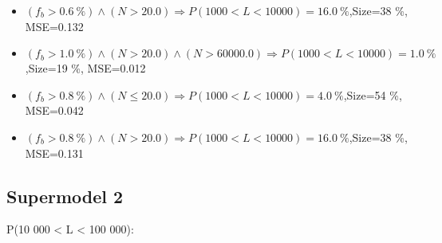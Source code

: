 \documentclass[numbered]{CSL}
\begin{document}
\begin{itemize}
\item $(f_b > 0.6~\%) \land (N > 20.0) \Rightarrow P(1 000 < L < 10 000) = 16.0~\%$,\hfill Size=38 \%, MSE=0.132
\item $(f_b > 1.0~\%) \land (N > 20.0) \land (N > 60000.0) \Rightarrow P(1 000 < L < 10 000) = 1.0~\%$,\hfill Size=19 \%, MSE=0.012
\item $(f_b > 0.8~\%) \land (N \leq 20.0) \Rightarrow P(1 000 < L < 10 000) = 4.0~\%$,\hfill Size=54 \%, MSE=0.042
\item $(f_b > 0.8~\%) \land (N > 20.0) \Rightarrow P(1 000 < L < 10 000) = 16.0~\%$,\hfill Size=38 \%, MSE=0.131
\end{itemize}

\subsection{Supermodel 2}
P(10 000 < L < 100 000):
\end{document}
